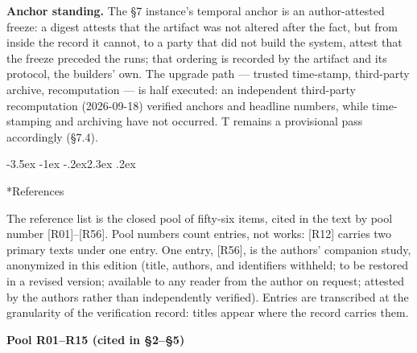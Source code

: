 \documentclass[11pt,a4paper]{article}
\makeatletter
\renewcommand\section{\@startsection{section}{1}{\z@}%
  {-3.5ex \@plus -1ex \@minus -.2ex}{2.3ex \@plus .2ex}%
  {\normalfont\Large\bfseries\raggedright}}
\makeatother
\begin{document}
\textbf{Anchor standing.} The §7 instance's temporal anchor is an author-attested freeze: a digest attests that the artifact was not altered after the fact, but from inside the record it cannot, to a party that did not build the system, attest that the freeze preceded the runs; that ordering is recorded by the artifact and its protocol, the builders' own. The upgrade path — trusted time-stamp, third-party archive, recomputation — is half executed: an independent third-party recomputation (2026-09-18) verified anchors and headline numbers, while time-stamping and archiving have not occurred. T remains a provisional pass accordingly (§7.4).

\section*{References}

The reference list is the closed pool of fifty-six items, cited in the text by pool number [R01]–[R56]. Pool numbers count entries, not works: [R12] carries two primary texts under one entry. One entry, [R56], is the authors' companion study, anonymized in this edition (title, authors, and identifiers withheld; to be restored in a revised version; available to any reader from the author on request; attested by the authors rather than independently verified). Entries are transcribed at the granularity of the verification record: titles appear where the record carries them.

\medskip
\noindent\textbf{Pool R01–R15 (cited in §2–§5)}\par\addvspace{2pt}
\end{document}
